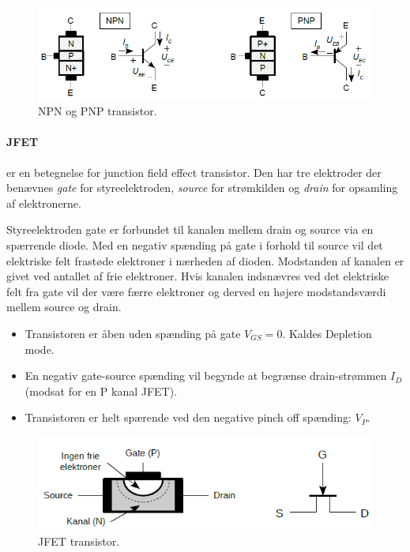 \documentclass[danish]{article}
\begin{document}
\begin{figure} [H]
	\centering
	\includegraphics[width=\linewidth]{graphics/transistor}
	\caption{NPN og PNP transistor.}
	\label{fig:transistor}
\end{figure}

\paragraph{JFET} er en betegnelse for junction field effect transistor. 
Den har tre elektroder der benævnes \textit{gate} for styreelektroden, \textit{source} for strømkilden og \textit{drain} for opsamling af
elektronerne. 

Styreelektroden gate er forbundet til kanalen mellem drain og source via en spærrende diode. 
Med en negativ spænding på gate i forhold til source vil det elektriske felt frastøde elektroner i nærheden af dioden. 
Modstanden af kanalen er givet ved antallet af frie elektroner.
Hvis kanalen indsnævres ved det elektriske felt fra gate vil der være færre elektroner og derved en højere modstandsværdi mellem source og drain.

\begin{itemize}
	\item Transistoren er åben uden spænding på gate $V_{GS}=0$. Kaldes Depletion mode.
	\item En negativ gate-source spænding vil begynde at begrænse drain-strømmen $I_D$ \newline (modsat for en P kanal JFET).
	\item Transistoren er helt spærende ved den negative pinch off spænding: $V_P$.
\end{itemize}

\begin{figure} [H]
	\centering
	\includegraphics[width=0.8\linewidth]{graphics/jfet}
	\caption{JFET transistor.}
	\label{fig:jfet}
\end{figure}
\end{document}
